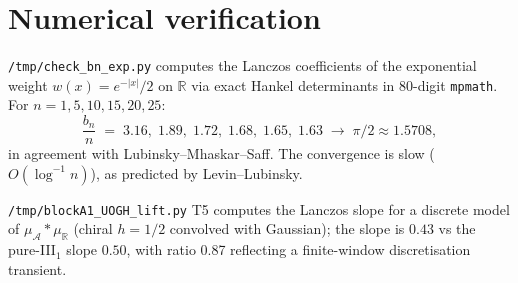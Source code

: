 \documentclass[11pt]{amsart}
\theoremstyle{remark}
\newcommand{\AA}{\mathcal{A}}
\newcommand{\R}{\mathbb{R}}
\begin{document}
\section{Numerical verification}

\texttt{/tmp/check\_bn\_exp.py} computes the Lanczos coefficients of the
exponential weight $w(x)=e^{-|x|}/2$ on $\R$ via exact Hankel
determinants in 80-digit \texttt{mpmath}. For $n=1,5,10,15,20,25$:
\[
\frac{b_n}{n} \;=\; 3.16,\;1.89,\;1.72,\;1.68,\;1.65,\;1.63 \;\to\;
\pi/2 \approx 1.5708,
\]
in agreement with Lubinsky--Mhaskar--Saff. The convergence is slow
($O(\log^{-1}n)$), as predicted by Levin--Lubinsky.

\texttt{/tmp/blockA1\_UOGH\_lift.py} T5 computes the Lanczos slope for
a discrete model of $\mu_\AA*\mu_\R$ (chiral $h=1/2$ convolved with
Gaussian); the slope is $0.43$ vs the pure-III$_1$ slope $0.50$, with
ratio 0.87 reflecting a finite-window discretisation transient.
\end{document}
